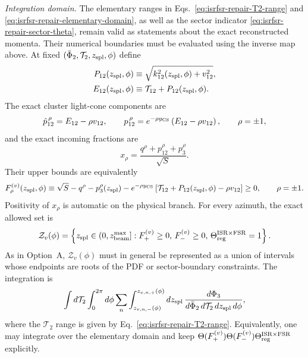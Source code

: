 \documentclass[11pt]{article}
\newcommand{\Ph}{\Phi}
\begin{document}
\medskip
\noindent
\textit{Integration domain.}
The elementary ranges in Eqs.~\eqref{eq:isrfsr-repair-T2-range} and
\eqref{eq:isrfsr-repair-elementary-domain}, as well as the sector indicator
\eqref{eq:isrfsr-repair-sector-theta}, remain valid as statements about the exact reconstructed momenta.
Their numerical boundaries must be evaluated using the inverse map above.  At fixed
$(\bar\Ph_2,\mathcal T_2,z_{\rm spl},\phi)$ define
\begin{align}
P_{12}(z_{\rm spl},\phi)
&\equiv
\sqrt{k_{12}^2(z_{\rm spl},\phi)+v_{12}^2},
\nonumber\\
E_{12}(z_{\rm spl},\phi)
&\equiv
\mathcal T_{12}+P_{12}(z_{\rm spl},\phi).
\label{eq:isrfsr-zrepair-domain-energy}
\end{align}
The exact cluster light-cone components are
\begin{equation}
\hat p_{12}^{\,\rho}
=
E_{12}-\rho v_{12},
\qquad
p_{12}^{\,\rho}
=
e^{-\rho y_{\rm CS}}
\left(E_{12}-\rho v_{12}\right),
\qquad
\rho=\pm1,
\label{eq:isrfsr-zrepair-exact-lightcone}
\end{equation}
and the exact incoming fractions are
\begin{equation}
x_\rho
=
\frac{q^\rho+p_{12}^\rho+p_3^\rho}{\sqrt S}.
\label{eq:isrfsr-zrepair-exact-xfractions}
\end{equation}
Their upper bounds are equivalently
\begin{equation}
F_\rho^{(v)}(z_{\rm spl},\phi)
\equiv
\sqrt S-q^\rho-p_3^\rho(z_{\rm spl})
-e^{-\rho y_{\rm CS}}
\left[
\mathcal T_{12}
+P_{12}(z_{\rm spl},\phi)
-\rho v_{12}
\right]
\ge0,
\qquad
\rho=\pm1.
\label{eq:isrfsr-zrepair-Fpm-bounds}
\end{equation}
Positivity of $x_\rho$ is automatic on the physical branch.  For every azimuth, the exact allowed set is
\begin{equation}
\mathcal Z_v(\phi)
=
\left\{
z_{\rm spl}\in(0,z_{\rm beam}^{\max}]:
F_+^{(v)}\ge0,\,
F_-^{(v)}\ge0,\,
\Theta_{\rm reg}^{\rm ISR\times FSR}=1
\right\}.
\label{eq:isrfsr-zrepair-Z-domain}
\end{equation}
As in Option~A, $\mathcal Z_v(\phi)$ must in general be represented as a union of intervals whose endpoints
are roots of the PDF or sector-boundary constraints.  The integration is
\begin{equation}
\int d\mathcal T_2
\int_0^{2\pi}d\phi
\sum_n
\int_{z_{v,n,-}(\phi)}^{z_{v,n,+}(\phi)}
dz_{\rm spl}\,
\frac{d\Ph_3}
{d\bar\Ph_2\,d\mathcal T_2\,dz_{\rm spl}\,d\phi},
\label{eq:isrfsr-zrepair-final-integration-domain}
\end{equation}
where the $\mathcal T_2$ range is given by Eq.~\eqref{eq:isrfsr-repair-T2-range}.  Equivalently, one may
integrate over the elementary domain and keep
$\Theta(F_+^{(v)})\Theta(F_-^{(v)})\Theta_{\rm reg}^{\rm ISR\times FSR}$ explicitly.
\end{document}
